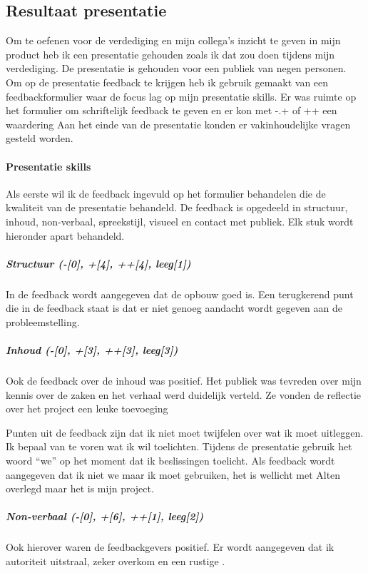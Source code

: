 \documentclass[a4paper, 11pt, oneside]{report}
\begin{document}
\subsection{Resultaat presentatie}

Om te oefenen voor de verdediging en mijn collega's inzicht te geven in mijn product heb ik een presentatie gehouden zoals ik dat zou doen tijdens mijn verdediging.
De presentatie is gehouden voor een publiek van negen personen.
Om op de presentatie feedback te krijgen heb ik gebruik gemaakt van een feedbackformulier waar de focus lag op mijn presentatie skills.
Er was ruimte op het formulier om schriftelijk feedback te geven en er kon met -.+ of ++ een waardering 
Aan het einde van de presentatie konden er vakinhoudelijke vragen gesteld worden.

\paragraph{Presentatie skills}
Als eerste wil ik de feedback ingevuld op het formulier behandelen die de kwaliteit van de presentatie behandeld.
De feedback is opgedeeld in structuur, inhoud, non-verbaal, spreekstijl, visueel en contact met publiek.
Elk stuk wordt hieronder apart behandeld.

\subparagraph{Structuur
(-[0], +[4], ++[4], leeg[1]) }

In de feedback wordt aangegeven dat de opbouw goed is.
Een terugkerend punt die in de feedback staat is dat er niet genoeg aandacht wordt gegeven aan de probleemstelling.

\subparagraph{Inhoud
(-[0], +[3], ++[3], leeg[3]) }

Ook de feedback over de inhoud was positief.
Het publiek was tevreden over mijn kennis over de zaken en het verhaal werd duidelijk verteld.
Ze vonden de reflectie over het project een leuke toevoeging 

Punten uit de feedback zijn dat ik niet moet twijfelen over wat ik moet uitleggen. 
Ik bepaal van te voren wat ik wil toelichten.
Tijdens de presentatie gebruik het woord ``we'' op het moment dat ik beslissingen toelicht.
Als feedback wordt aangegeven dat ik niet we maar ik moet gebruiken, het is wellicht met Alten overlegd maar het is mijn project.


\subparagraph{Non-verbaal
(-[0], +[6], ++[1], leeg[2])}

Ook hierover waren de feedbackgevers positief. Er wordt aangegeven dat ik autoriteit uitstraal, zeker overkom en een rustige . 
\end{document}
